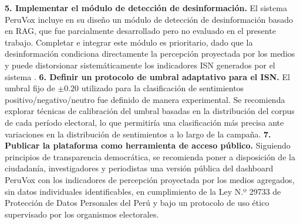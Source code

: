 \textbf{5. Implementar el módulo de detección de desinformación.} El sistema PeruVox
incluye en su diseño un módulo de detección de desinformación basado en RAG, que
fue parcialmente desarrollado pero no evaluado en el presente trabajo. Completar
e integrar este módulo es prioritario, dado que la desinformación condiciona
directamente la percepción proyectada por los medios y puede distorsionar sistemáticamente los
indicadores ISN generados por el sistema \parencite{pr_chen2024combating_misinformation}.
\textbf{6. Definir un protocolo de umbral adaptativo para el ISN.} El umbral fijo de $\pm 0.20$ utilizado para la clasificación de sentimientos positivo/negativo/neutro
fue definido de manera experimental. Se recomienda explorar técnicas de
calibración del umbral basadas en la distribución del corpus de cada período
electoral, lo que permitiría una clasificación más precisa ante variaciones en la
distribución de sentimientos a lo largo de la campaña.
\textbf{7. Publicar la plataforma como herramienta de acceso público.} Siguiendo
principios de transparencia democrática, se recomienda poner a disposición de la
ciudadanía, investigadores y periodistas una versión pública del dashboard PeruVox
con los indicadores de percepción proyectada por los medios agregados, sin datos individuales
identificables, en cumplimiento de la Ley N.º 29733 de Protección de Datos
Personales del Perú y bajo un protocolo de uso ético supervisado por los
organismos electorales.